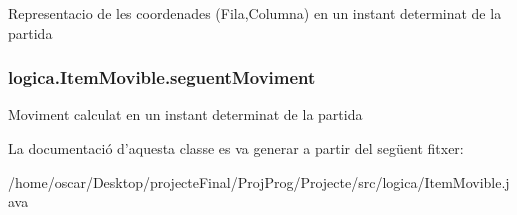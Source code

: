 Representacio de les coordenades (Fila,Columna) en un instant determinat de la partida \hypertarget{classlogica_1_1_item_movible_a6e7ab9e5b0e363972a753e6b1550e7fb}{
\subsubsection[{seguent\+Moviment}]{ logica.\+Item\+Movible.\+seguent\+Moviment\hspace{0.3cm}{\ttfamily [protected]}}}\label{classlogica_1_1_item_movible_a6e7ab9e5b0e363972a753e6b1550e7fb}
Moviment calculat en un instant determinat de la partida 

La documentació d'aquesta classe es va generar a partir del següent fitxer\+:\begin{DoxyCompactItemize}
\item 
/home/oscar/\+Desktop/projecte\+Final/\+Proj\+Prog/\+Projecte/src/logica/Item\+Movible.\+java\end{DoxyCompactItemize}
